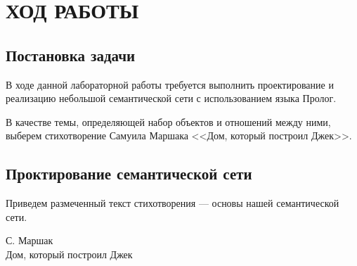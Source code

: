 \section{ХОД РАБОТЫ}

\subsection{Постановка задачи}

В ходе данной лабораторной работы требуется выполнить проектирование
и реализацию небольшой семантической сети с использованием языка Пролог.

В качестве темы, определяющей набор объектов и отношений между ними, 
выберем стихотворение Самуила Маршака <<Дом, который построил Джек>>.

\subsection{Проктирование семантической сети}

Приведем размеченный текст стихотворения --- 
основы нашей семантической сети.

\begin{center}
С. Маршак \\
Дом, который построил Джек
\end{center}

